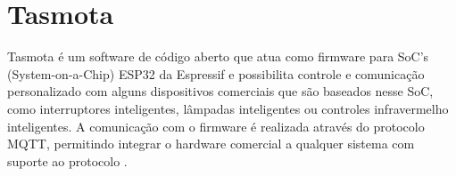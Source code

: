 \section{Tasmota}
\label{sec:tasmota}
Tasmota é um software de código aberto que atua como firmware para SoC’s (System-on-a-Chip) ESP32 
da Espressif e possibilita controle e comunicação personalizado com alguns dispositivos comerciais que são 
baseados nesse SoC, como interruptores inteligentes, lâmpadas inteligentes ou controles infravermelho
inteligentes.
A comunicação com o firmware é realizada através do protocolo MQTT, permitindo integrar o hardware comercial
a qualquer sistema com suporte ao protocolo \cite{tasmota-1}.



